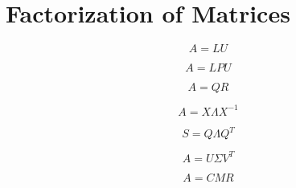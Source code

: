 \chapter{Factorization of Matrices}

$$A = LU$$

$$A = LPU$$

$$A = QR$$

$$A = X \Lambda X^{-1}$$

$$S = Q \Lambda Q^T$$

$$A = U \Sigma V^T$$

$$A = CMR$$